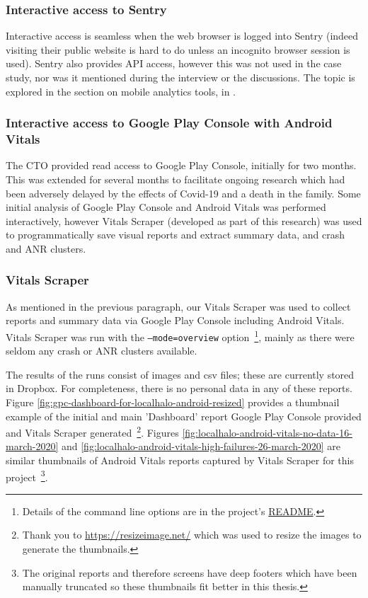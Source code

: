 \subsubsection{Interactive access to Sentry}

Interactive access is seamless when the web browser is logged into Sentry (indeed visiting their public website is hard to do unless an incognito browser session is used). Sentry also provides API access, however this was not used in the case study, nor was it mentioned during the interview or the discussions. The topic is explored in the section on mobile analytics tools, in \href{analytics-tools-sentry}{}. 

\subsubsection{Interactive access to Google Play Console with Android Vitals}

The CTO provided read access to Google Play Console, initially for two months. This was extended for several months to facilitate ongoing research which had been adversely delayed by the effects of Covid-19 and a death in the family. Some initial analysis of Google Play Console and Android Vitals was performed interactively, however Vitals Scraper (developed as part of this research) was used to programmatically save visual reports and extract summary data, and crash and ANR clusters.

\subsubsection{Vitals Scraper} 

As mentioned in the previous paragraph, our Vitals Scraper was used to collect reports and summary data via Google Play Console including Android Vitals. Vitals Scraper was run with the \texttt{--mode=overview} option~\footnote{Details of the command line options are in the project's \href{https://github.com/commercetest/vitals-scraper}{README}.}, mainly as there were seldom any crash or ANR clusters available.

The results of the runs consist of images and csv files; these are currently stored in Dropbox. For completeness, there is no personal data in any of these reports. Figure \ref{fig:gpc-dashboard-for-localhalo-android-resized} provides a thumbnail example of the initial and main 'Dashboard' report Google Play Console provided and Vitals Scraper generated~\footnote{Thank you to \url{https://resizeimage.net/} which was used to resize the images to generate the thumbnails.}. Figures \ref{fig:localhalo-android-vitals-no-data-16-march-2020} and \ref{fig:localhalo-android-vitals-high-failures-26-march-2020} are similar thumbnails of Android Vitals reports captured by Vitals Scraper for this project~\footnote{The original reports and therefore screens have deep footers which have been manually truncated so these thumbnails fit better in this thesis.}.


